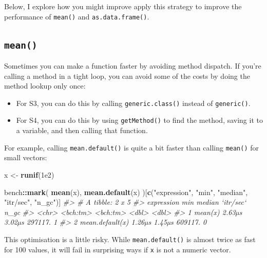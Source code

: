 \documentclass[]{book}
\makeatletter
\newenvironment{Shaded}{\begin{snugshade}}{\end{snugshade}}
\newcommand{\CommentTok}[1]{\textcolor[rgb]{0.37,0.37,0.37}{\textit{#1}}}
\newcommand{\FloatTok}[1]{\textcolor[rgb]{0.06,0.06,0.06}{#1}}
\newcommand{\KeywordTok}[1]{\textcolor[rgb]{0.27,0.27,0.27}{\textbf{#1}}}
\newcommand{\NormalTok}[1]{#1}
\newcommand{\OperatorTok}[1]{\textcolor[rgb]{0.43,0.43,0.43}{\textbf{#1}}}
\newcommand{\StringTok}[1]{\textcolor[rgb]{0.5,0.5,0.5}{#1}}
\newcommand{\indexc}[1]{\index{#1@\texttt{#1}}}
\makeatother
\begin{document}
Below, I explore how you might improve apply this strategy to improve the performance of \texttt{mean()} and \texttt{as.data.frame()}.

\hypertarget{mean}{%
\subsection{\texorpdfstring{\texttt{mean()}}{mean()}}\label{mean}}

\indexc{.Internal()}


Sometimes you can make a function faster by avoiding method dispatch. If you're calling a method in a tight loop, you can avoid some of the costs by doing the method lookup only once:

\begin{itemize}
\item
  For S3, you can do this by calling \texttt{generic.class()} instead of \texttt{generic()}.
\item
  For S4, you can do this by using \texttt{getMethod()} to find the method, saving
  it to a variable, and then calling that function.
\end{itemize}

For example, calling \texttt{mean.default()} is quite a bit faster than calling \texttt{mean()} for small vectors:

\begin{Shaded}
\begin{Highlighting}[]
\NormalTok{x <-}\StringTok{ }\KeywordTok{runif}\NormalTok{(}\FloatTok{1e2}\NormalTok{)}

\NormalTok{bench}\OperatorTok{::}\KeywordTok{mark}\NormalTok{(}
  \KeywordTok{mean}\NormalTok{(x),}
  \KeywordTok{mean.default}\NormalTok{(x)}
\NormalTok{)[}\KeywordTok{c}\NormalTok{(}\StringTok{"expression"}\NormalTok{, }\StringTok{"min"}\NormalTok{, }\StringTok{"median"}\NormalTok{, }\StringTok{"itr/sec"}\NormalTok{, }\StringTok{"n_gc"}\NormalTok{)]}
\CommentTok{#> # A tibble: 2 x 5}
\CommentTok{#>   expression           min   median `itr/sec`  n_gc}
\CommentTok{#>   <chr>           <bch:tm> <bch:tm>     <dbl> <dbl>}
\CommentTok{#> 1 mean(x)           2.63µs   3.02µs   297117.     1}
\CommentTok{#> 2 mean.default(x)   1.26µs   1.45µs   609117.     0}
\end{Highlighting}
\end{Shaded}

This optimisation is a little risky. While \texttt{mean.default()} is almost twice as fast for 100 values, it will fail in surprising ways if \texttt{x} is not a numeric vector.
\end{document}
